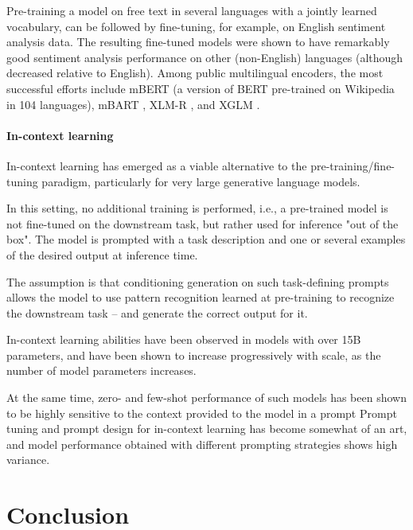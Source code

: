 Pre-training a model on free text in several languages with a jointly learned vocabulary, can be followed by fine-tuning, for example, on English sentiment analysis data.  The resulting fine-tuned models  were shown to have remarkably good sentiment analysis performance on other (non-English) languages (although decreased relative to English). Among public multilingual encoders, the most successful efforts include mBERT (a version of BERT pre-trained on Wikipedia in 104 languages), mBART \citep{Liu2020MultilingualDP}, XLM-R \citep{Conneau2020UnsupervisedCR}, and XGLM \citep{Lin2021FewshotLW}.

\paragraph{In-context learning}

In-context learning \citep{Brown2020LanguageMA} has emerged as a viable alternative to the pre-training/fine-tuning paradigm, particularly for very large generative language models.

In this setting, no additional training is performed, i.e., a pre-trained model is not fine-tuned on the downstream task, but rather used for inference "out of the box". The model is prompted with a task description and one or several examples of the desired output at inference time. 

The assumption is that conditioning generation on such task-defining prompts allows the model to use pattern recognition learned at pre-training to recognize the downstream task -- and generate the correct output for it. 

In-context learning abilities have been observed in models with over 15B parameters, and have been shown to increase progressively with scale, as the number of model parameters increases. 

At the same time, zero- and few-shot performance of such models has been shown to be highly sensitive to the context provided to the model in a prompt Prompt tuning and prompt design for in-context learning has become somewhat of an art, and model performance obtained with different prompting strategies shows high variance.

\section{Conclusion}
\label{sec:conclusion}

